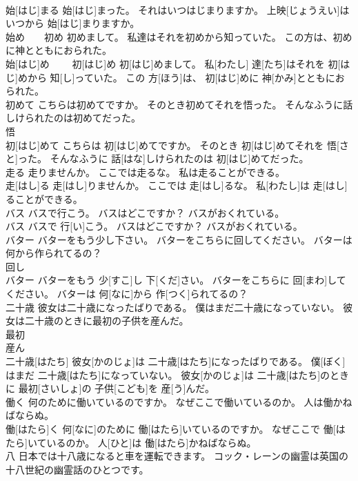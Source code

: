 \documentclass[8pt]{extreport}
\begin{document}
\begin{CJK}{UTF8}{min}
\\	始[はじ]まる 始[はじ]まった。 それはいつはじまりますか。 上映[じょうえい]はいつから 始[はじ]まりますか。
\\	始め　　初め 初めまして。 私達はそれを初めから知っていた。 この方は、初めに神とともにおられた。	
\\	始[はじ]め　　 初[はじ]め 初[はじ]めまして。 私[わたし] 達[たち]はそれを 初[はじ]めから 知[し]っていた。 この 方[ほう]は、 初[はじ]めに 神[かみ]とともにおられた。
\\	初めて こちらは初めてですか。 そのとき初めてそれを悟った。 そんなふうに話しけられたのは初めてだった。	
\\	悟 
\\	初[はじ]めて こちらは 初[はじ]めてですか。 そのとき 初[はじ]めてそれを 悟[さと]った。 そんなふうに 話[はな]しけられたのは 初[はじ]めてだった。
\\	走る 走りませんか。 ここでは走るな。 私は走ることができる。	
\\	走[はし]る 走[はし]りませんか。 ここでは 走[はし]るな。 私[わたし]は 走[はし]ることができる。
\\	バス バスで行こう。 バスはどこですか？ バスがおくれている。	
\\	バス バスで 行[い]こう。 バスはどこですか？ バスがおくれている。
\\	バター バターをもう少し下さい。 バターをこちらに回してください。 バターは何から作られてるの？	
\\	回し 
\\	バター バターをもう 少[すこ]し 下[くだ]さい。 バターをこちらに 回[まわ]してください。 バターは 何[なに]から 作[つく]られてるの？
\\	二十歳 彼女は二十歳になったばりである。 僕はまだ二十歳になっていない。 彼女は二十歳のときに最初の子供を産んだ。	
\\	最初 
\\	産ん 
\\	二十歳[はたち] 彼女[かのじょ]は 二十歳[はたち]になったばりである。 僕[ぼく]はまだ 二十歳[はたち]になっていない。 彼女[かのじょ]は 二十歳[はたち]のときに 最初[さいしょ]の 子供[こども]を 産[う]んだ。
\\	働く 何のために働いているのですか。 なぜここで働いているのか。 人は働かねばならぬ。	
\\	働[はたら]く 何[なに]のために 働[はたら]いているのですか。 なぜここで 働[はたら]いているのか。 人[ひと]は 働[はたら]かねばならぬ。
\\	八 日本では十八歳になると車を運転できます。 コック・レーンの幽霊は英国の十八世紀の幽霊話のひとつです。	

\end{CJK}
\end{document}
